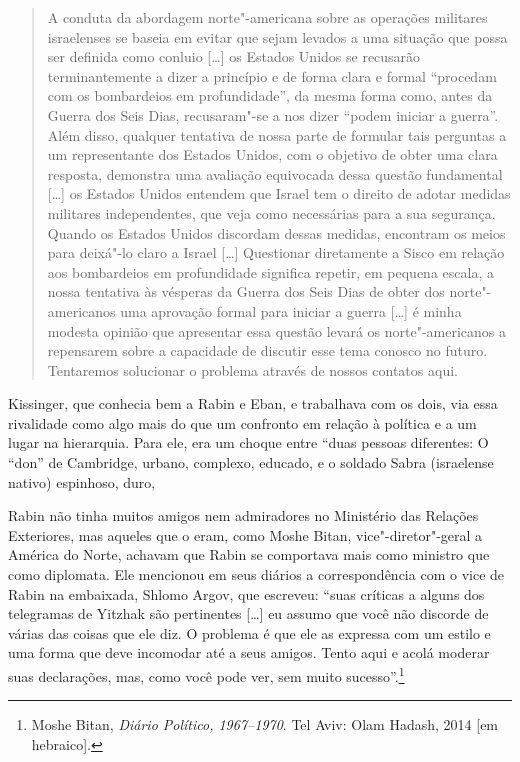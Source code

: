 \begin{quote}
A conduta da abordagem norte"-americana sobre as operações militares
israelenses se baseia em evitar que sejam levados a uma situação que
possa ser definida como conluio {[}\ldots{}{]} os Estados Unidos se recusarão
terminantemente a dizer a princípio e de forma clara e formal ``procedam
com os bombardeios em profundidade'', da mesma forma como, antes da
Guerra dos Seis Dias, recusaram"-se a nos dizer ``podem iniciar a
guerra''. Além disso, qualquer tentativa de nossa parte de formular tais
perguntas a um representante dos Estados Unidos, com o objetivo de obter
uma clara resposta, demonstra uma avaliação equivocada dessa questão
fundamental {[}\ldots{}{]} os Estados Unidos entendem que Israel tem o direito de adotar medidas
militares independentes, que veja como necessárias para a sua segurança.
Quando os Estados Unidos discordam dessas medidas, encontram os meios
para deixá"-lo claro a Israel {[}\ldots{}{]} Questionar diretamente a Sisco em
relação aos bombardeios em profundidade significa repetir, em pequena
escala, a nossa tentativa às vésperas da Guerra dos Seis Dias de obter
dos norte"-americanos uma aprovação formal para iniciar a guerra {[}\ldots{}{]} é
minha modesta opinião que apresentar essa questão levará os
norte"-americanos a repensarem sobre a capacidade de discutir esse tema
conosco no futuro. Tentaremos solucionar o problema através de nossos
contatos aqui.
\end{quote}

Kissinger, que conhecia bem a Rabin e Eban, e trabalhava com os dois,
via essa rivalidade como algo mais do que um confronto em relação à
política e a um lugar na hierarquia. Para ele, era um choque entre ``duas
pessoas diferentes: O ``don'' de Cambridge, urbano, complexo, educado, e
o soldado Sabra (israelense nativo) espinhoso, duro,

Rabin não tinha muitos amigos nem admiradores no Ministério das Relações
Exteriores, mas aqueles que o eram, como Moshe Bitan, vice"-diretor"-geral
a América do Norte, achavam que Rabin se comportava mais como
ministro que como diplomata. Ele mencionou em seus diários a
correspondência com o vice de Rabin na embaixada, Shlomo Argov, que
escreveu: ``suas críticas a alguns dos telegramas de Yitzhak são
pertinentes {[}\ldots{}{]} eu assumo que você não discorde de várias das coisas que
ele diz. O problema é que ele as expressa com um estilo e uma forma que
deve incomodar até a seus amigos. Tento aqui e acolá moderar suas
declarações, mas, como você pode ver, sem muito sucesso''.\footnote{Moshe Bitan, \emph{Diário Político, 1967--1970}. Tel Aviv: Olam Hadash, 2014 {[}em
hebraico{]}.}

